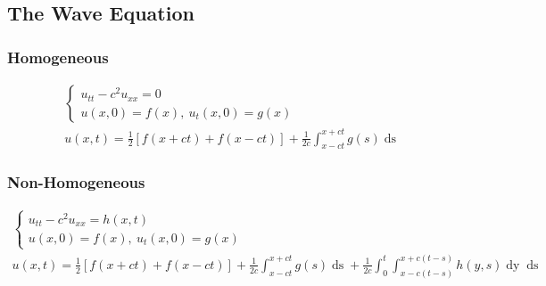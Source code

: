 \documentclass{article}
\begin{document}
\subsection{The Wave Equation}
\subsubsection*{Homogeneous}
\begin{gather*}
\begin{cases}
u_{tt} - c^{2}u_{xx} = 0\\
u(x,0) = f(x),\ u_{t}(x,0) = g(x)
\end{cases}\\
u(x,t) = \frac{1}{2}\left[f(x+ct) + f(x-ct)\right] + \frac{1}{2c}\int_{x-ct}^{x+ct}g(s)\mathop{ds}
\end{gather*}
\subsubsection*{Non-Homogeneous}
\begin{gather*}
\begin{cases}
u_{tt} - c^{2}u_{xx} = h(x,t)\\
u(x,0) = f(x),\ u_{t}(x,0) = g(x)
\end{cases}\\
u(x,t) = \frac{1}{2}\left[f(x+ct) + f(x-ct)\right] + \frac{1}{2c}\int_{x-ct}^{x+ct}g(s)\mathop{ds} + \frac{1}{2c}\int_{0}^{t}\int_{x-c(t-s)}^{x+c(t-s)}h(y,s)\mathop{dy}\mathop{ds}
\end{gather*}
\end{document}
